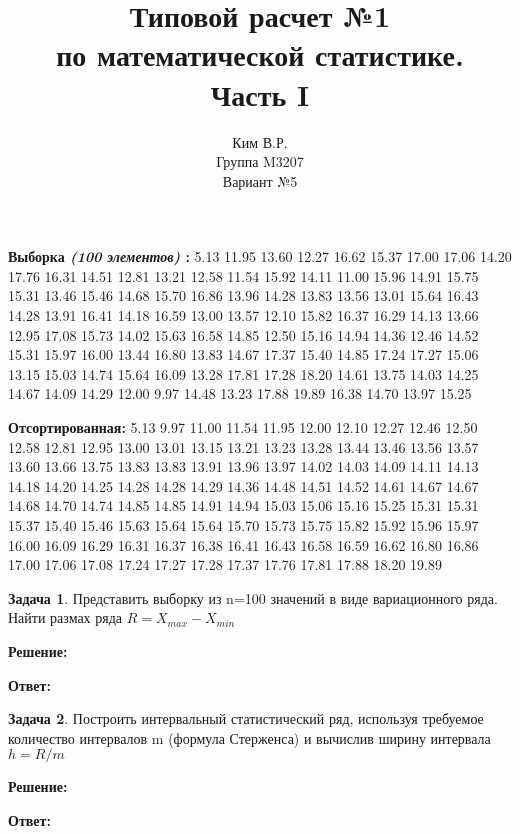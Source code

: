 \documentclass[a4paper,12pt]{article}
\title{Типовой расчет №1 \\ по математической статистике. \\ Часть I}
\author{Ким В.Р. \\ Группа M3207 \\ Вариант №5}
\date{}
\theoremstyle{definition}
\newtheorem{problem}{Задача}
\newenvironment{solution}
{\begin{shaded}\textbf{Решение:}\par}
{\end{shaded}}
\newenvironment{answer}
{\par\noindent\textbf{Ответ:} \color{blue}}
{\par}
\begin{document}
\maketitle

\par\noindent\textbf{Выборка \textit{(100 элементов)} :}
5.13 11.95 13.60 12.27 16.62 15.37 17.00 17.06 14.20 17.76 16.31 14.51 12.81 13.21 12.58
11.54 15.92 14.11 11.00 15.96 14.91 15.75 15.31 13.46 15.46 14.68 15.70 16.86 13.96 14.28
13.83 13.56 13.01 15.64 16.43 14.28 13.91 16.41 14.18 16.59 13.00 13.57 12.10 15.82 16.37
16.29 14.13 13.66 12.95 17.08 15.73 14.02 15.63 16.58 14.85 12.50 15.16 14.94 14.36 12.46
14.52 15.31 15.97 16.00 13.44 16.80 13.83 14.67 17.37 15.40 14.85 17.24 17.27 15.06 13.15
15.03 14.74 15.64 16.09 13.28 17.81 17.28 18.20 14.61 13.75 14.03 14.25 14.67 14.09 14.29
12.00 9.97 14.48 13.23 17.88 19.89 16.38 14.70 13.97 15.25
\\
\par\noindent\textbf{Отсортированная:}
5.13 9.97 11.00 11.54 11.95 12.00 12.10 12.27 12.46 12.50 12.58 12.81 12.95 13.00 13.01
13.15 13.21 13.23 13.28 13.44 13.46 13.56 13.57 13.60 13.66 13.75 13.83 13.83 13.91 13.96
13.97 14.02 14.03 14.09 14.11 14.13 14.18 14.20 14.25 14.28 14.28 14.29 14.36 14.48 14.51
14.52 14.61 14.67 14.67 14.68 14.70 14.74 14.85 14.85 14.91 14.94 15.03 15.06 15.16 15.25
15.31 15.31 15.37 15.40 15.46 15.63 15.64 15.64 15.70 15.73 15.75 15.82 15.92 15.96 15.97
16.00 16.09 16.29 16.31 16.37 16.38 16.41 16.43 16.58 16.59 16.62 16.80 16.86 17.00 17.06
17.08 17.24 17.27 17.28 17.37 17.76 17.81 17.88 18.20 19.89

\vspace{8pt}
\begin{problem}
    Представить выборку из n=100 значений в виде вариационного ряда. Найти
    размах ряда $R = X_{max} - X_{min}$
        \begin{solution}
        \end{solution}

        \begin{answer}
        \end{answer}

    \end{problem}



\vspace{8pt}
\begin{problem}
    Построить интервальный статистический ряд, используя требуемое количество
    интервалов m (формула Стерженса) и вычислив ширину интервала \(h = R/m\)
    
        \begin{solution}
        \end{solution}
    
        \begin{answer}
        \end{answer}
    
    \end{problem}
\end{document}
